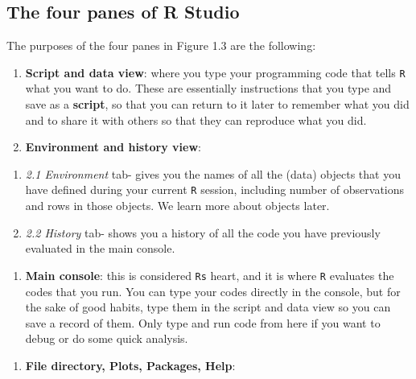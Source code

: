 \documentclass[
]{book}
\providecommand{\tightlist}{%
  \setlength{\itemsep}{0pt}\setlength{\parskip}{0pt}}
\begin{document}
\hypertarget{the-four-panes-of-r-studio}{%
\subsection{The four panes of R Studio}\label{the-four-panes-of-r-studio}}

The purposes of the four panes in Figure 1.3 are the following:

\begin{enumerate}
\def\labelenumi{\arabic{enumi}.}
\item
  \textbf{Script and data view}: where you type your programming code that tells \texttt{R} what you want to do. These are essentially instructions that you type and save as a \textbf{script}, so that you can return to it later to remember what you did and to share it with others so that they can reproduce what you did.
\item
  \textbf{Environment and history view}:
\end{enumerate}

\begin{enumerate}
\def\labelenumi{\roman{enumi})}
\item
  \emph{2.1 Environment} tab- gives you the names of all the (data) objects that you have defined during your current \texttt{R} session, including number of observations and rows in those objects. We learn more about objects later.
\item
  \emph{2.2 History} tab- shows you a history of all the code you have previously evaluated in the main console.
\end{enumerate}

\begin{enumerate}
\def\labelenumi{\arabic{enumi}.}
\setcounter{enumi}{2}
\tightlist
\item
  \textbf{Main console}: this is considered \texttt{R\textquotesingle{}s} heart, and it is where \texttt{R} evaluates the codes that you run. You can type your codes directly in the console, but for the sake of good habits, type them in the script and data view so you can save a record of them. Only type and run code from here if you want to debug or do some quick analysis.
\end{enumerate}

\begin{enumerate}
\def\labelenumi{\arabic{enumi}.}
\setcounter{enumi}{3}
\tightlist
\item
  \textbf{File directory, Plots, Packages, Help}:
\end{enumerate}
\end{document}
